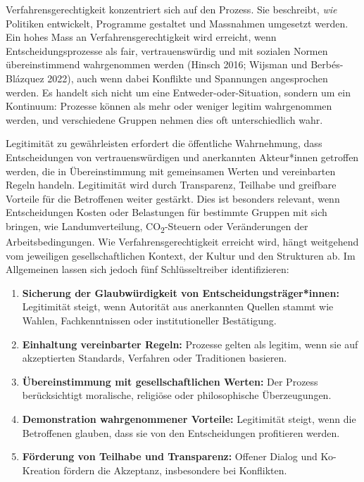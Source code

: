 \documentclass[
  nswissgerman,
  a4paper,
  DIV=11,
  numbers=noendperiod,
  oneside,
  openany]{scrreprt}
\begin{document}
Verfahrensgerechtigkeit konzentriert sich auf den Prozess. Sie
beschreibt, \emph{wie} Politiken entwickelt, Programme gestaltet und
Massnahmen umgesetzt werden. Ein hohes Mass an Verfahrensgerechtigkeit
wird erreicht, wenn Entscheidungsprozesse als fair, vertrauenswürdig und
mit sozialen Normen übereinstimmend wahrgenommen werden (Hinsch 2016;
Wijsman und Berbés-Blázquez 2022), auch wenn dabei Konflikte und
Spannungen angesprochen werden. Es handelt sich nicht um eine
Entweder-oder-Situation, sondern um ein Kontinuum: Prozesse können als
mehr oder weniger legitim wahrgenommen werden, und verschiedene Gruppen
nehmen dies oft unterschiedlich wahr.

Legitimität zu gewährleisten erfordert die öffentliche Wahrnehmung, dass
Entscheidungen von vertrauenswürdigen und anerkannten Akteur*innen
getroffen werden, die in Übereinstimmung mit gemeinsamen Werten und
vereinbarten Regeln handeln. Legitimität wird durch Transparenz,
Teilhabe und greifbare Vorteile für die Betroffenen weiter gestärkt.
Dies ist besonders relevant, wenn Entscheidungen Kosten oder Belastungen
für bestimmte Gruppen mit sich bringen, wie Landumverteilung,
CO\textsubscript{2}-Steuern oder Veränderungen der Arbeitsbedingungen.
Wie Verfahrensgerechtigkeit erreicht wird, hängt weitgehend vom
jeweiligen gesellschaftlichen Kontext, der Kultur und den Strukturen ab.
Im Allgemeinen lassen sich jedoch fünf Schlüsseltreiber identifizieren:

\begin{enumerate}
\def\labelenumi{\arabic{enumi}.}
\item
  \textbf{Sicherung der Glaubwürdigkeit von Entscheidungsträger*innen:}
  Legitimität steigt, wenn Autorität aus anerkannten Quellen stammt wie
  Wahlen, Fachkenntnissen oder institutioneller Bestätigung.
\item
  \textbf{Einhaltung vereinbarter Regeln:} Prozesse gelten als legitim,
  wenn sie auf akzeptierten Standards, Verfahren oder Traditionen
  basieren.
\item
  \textbf{Übereinstimmung mit gesellschaftlichen Werten:} Der Prozess
  berücksichtigt moralische, religiöse oder philosophische
  Überzeugungen.
\item
  \textbf{Demonstration wahrgenommener Vorteile:} Legitimität steigt,
  wenn die Betroffenen glauben, dass sie von den Entscheidungen
  profitieren werden.
\item
  \textbf{Förderung von Teilhabe und Transparenz:} Offener Dialog und
  Ko-Kreation fördern die Akzeptanz, insbesondere bei Konflikten.
\end{enumerate}
\end{document}
